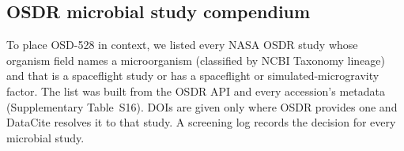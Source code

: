 \subsection*{OSDR microbial study compendium}
To place OSD-528 in context, we listed every NASA OSDR study whose organism field names a microorganism (classified by NCBI Taxonomy lineage) and that is a spaceflight study or has a spaceflight or simulated-microgravity factor. The list was built from the OSDR API and every accession's metadata (Supplementary Table~S16). DOIs are given only where OSDR provides one and DataCite resolves it to that study. A screening log records the decision for every microbial study.
